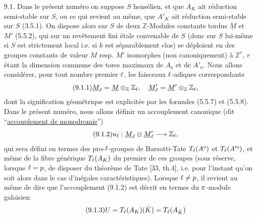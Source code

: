 9.1. Dans le présent numéro on suppose $S$ hensélien, et que $A_K$ ait réduction semi-stable sur $S$, ou ce qui revient au même, que $A'_K$ ait réduction semi-stable sur $S$ (3.5.1). On dispose alors sur $S$ de deux $\mathbb Z$-Modules constants tordus $\underline M$ et $M'$ (5.5.2), qui sur un revêtement fini étale convenable de $S$ (donc sur $S$ lui-même si $S$ est strictement local i.e. si $k$ est séparablement clos) se déploient en des groupes constants de valeur $M$ resp. $M'$ isomorphes (non canoniquement) à $\mathbb Z^r$, $r$ étant la dimension commune des tores maximaux de $A_o$ et de $A'_o$. Nous allons considérer, pour tout nombre premier $\ell$, les faisceaux $\ell$-adiques correspondants
\[
\tag*{(9.1.1)}
\underline M_{\ell}=\underline M\otimes_{\mathbb Z}\mathbb Z_{\ell},\quad
\underline M'_{\ell}=\underline M'\otimes_{\mathbb Z}\mathbb Z_{\ell},
\]
dont la signification géométrique est explicitée par les formules (5.5.7) et (5.5.8). Dans le présent numéro, nous allons définir un accouplement canonique (dit ``\uline{accouplement de monodromie}'')
\[
\tag*{(9.1.2)}
u_{\ell}:\underline M_{\ell}\otimes\underline M'_{\ell}\longrightarrow\mathbb Z_{\ell},
\]
qui sera défini en termes des pro-$\ell$-groupes de Barsotti-Tate $T_{\ell}(A^o)$ et $T_{\ell}(A'^{o})$, et même de la fibre générique $T_{\ell}(A_K)$ du premier de ces groupes (sous réserve, lorsque $\ell=p$, de disposer du théorème de Tate [33, th.4], i.e. pour l'instant qu'on soit alors dans le cas d'inégales caractéristiques). Lorsque $\ell\ne p$, il revient au même de dire que l'accouplement (9.1.2) est décrit en termes du $\pi$-module galoisien
\[
\tag*{(9.1.3)}
U=T_{\ell}(A_K)(\bar K)=T_{\ell}(A_{\bar K})
\]

